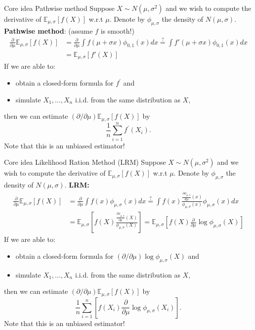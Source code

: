 \documentclass[pdf, handout]{beamer}
\begin{document}
\begin{frame}{Core idea Pathwise method}
Suppose $X \sim N(\mu,\sigma^2)$ and we wish to compute the derivative of $\mathbb{E}_{\mu,\sigma}[f(X)]$ w.r.t $\mu$. Denote by $\phi_{\mu,\sigma}$ the density of $N(\mu,\sigma)$.
\vskip4mm
\textbf{Pathwise method}: (assume $f$ is smooth!)
\begin{align*}
\frac{\partial}{\partial\mu} \mathbb{E}_{\mu,\sigma}[f(X)] &= \frac{\partial}{\partial\mu} \int f(\mu+\sigma x) \phi_{0,1}(x) dx \stackrel{?}{=} \int f'(\mu+\sigma x) \phi_{0,1}(x) dx \\
&= \mathbb{E}_{\mu,\sigma}[ f'(X)]
\end{align*} 
If we are able to:
\begin{itemize}
\item obtain a closed-form formula for $f^\prime$ and
\item simulate $X_1,\dots,X_n$ i.i.d. from the same distribution as $X$,
\end{itemize}
then we can estimate $(\partial/\partial\mu) \mathbb{E}_{\mu,\sigma}[f(X)]$ by
\[
\frac{1}{n}\sum_{i=1}^n f^\prime(X_i).
\]
Note that this is an unbiased estimator!
\end{frame}

\begin{frame}{Core idea Likelihood Ration Method (LRM)}
Suppose $X \sim N(\mu,\sigma^2)$ and we wish to compute the derivative of $\mathbb{E}_{\mu,\sigma}[f(X)]$ w.r.t $\mu$. Denote by $\phi_{\mu,\sigma}$ the density of $N(\mu,\sigma)$.
\vskip4mm
\textbf{LRM:}
\begin{align*}
\frac{\partial}{\partial\mu} \mathbb{E}_{\mu,\sigma}[f(X)] &= \frac{\partial}{\partial\mu} \int f(x) \phi_{\mu,\sigma}(x) dx \stackrel{?}{=} \int f(x) \frac{\frac{\partial  \phi_{\mu,\sigma}}{d\mu}(x)}{\phi_{\mu,\sigma}(x)} \phi_{\mu,\sigma}(x) dx
\\
&= \mathbb{E}_{\mu,\sigma}\left[f(X) \frac{\frac{\partial  \phi_{\mu,\sigma}}{\partial\mu}(X)}{\phi_{\mu,\sigma}(X)}  \right]
= 
\mathbb{E}_{\mu,\sigma}\left[f(X) \frac{\partial}{\partial\mu} \log  \phi_{\mu,\sigma}(X)  \right]
\end{align*}
If we are able to:
\begin{itemize}
\item obtain a closed-form formula for $(\partial/\partial\mu) \log  \phi_{\mu,\sigma}(X)$ and
\item simulate $X_1,\dots,X_n$ i.i.d. from the same distribution as $X$,
\end{itemize}
then we can estimate $(\partial/\partial\mu) \mathbb{E}_{\mu,\sigma}[f(X)]$ by
\[
\frac{1}{n}\sum_{i=1}^n
\left[
 f(X_i) \frac{\partial}{\partial\mu} \log  \phi_{\mu,\sigma}(X_i)\right].
\]
Note that this is an unbiased estimator!
\end{frame}
\end{document}
